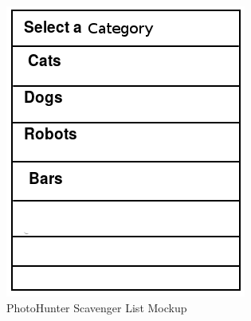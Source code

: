 \documentclass{article}
\begin{document}
\begin{figure}[H]
\caption{PhotoHunter Scavenger List Mockup}
\centering
\includegraphics[width =\textwidth, height=\textheight, keepaspectratio]{ss_photohunter_dataset}
\end{figure}
\end{document}
